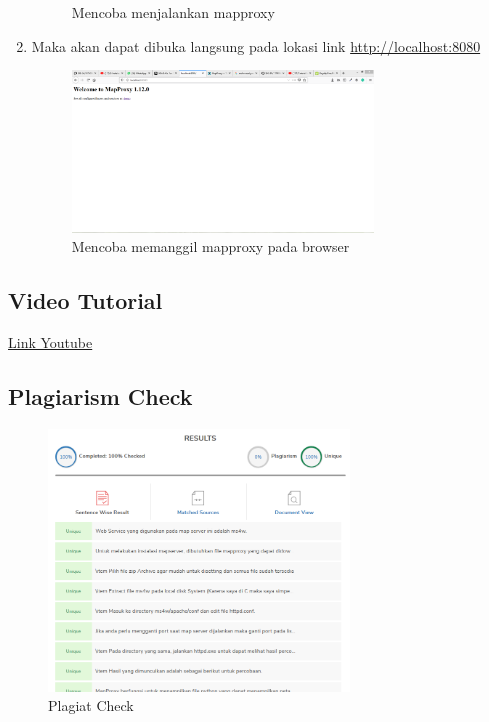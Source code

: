 \begin{enumerate}
\begin{figure}[H]
		\centering
		\caption{Mencoba menjalankan mapproxy}
	\end{figure}
    \item Maka akan dapat dibuka langsung pada lokasi link \href{http://localhost:8080}{http://localhost:8080}
    \hfill\break
	\begin{figure}[H]
		\includegraphics[width=8cm]{figures/1174035/tugas4/yaml_7.png}
		\centering
		\caption{Mencoba memanggil mapproxy pada browser}
	\end{figure}
\end{enumerate}
\subsection{Video Tutorial}
\href{https://youtu.be/7AzaqTXLK8A}{Link Youtube}
\subsection{Plagiarism Check}
\hfill\break
\begin{figure}[H]
    \includegraphics[width=8cm]{figures/1174035/tugas4/Plagiat.png}
    \centering
    \caption{Plagiat Check}
\end{figure}